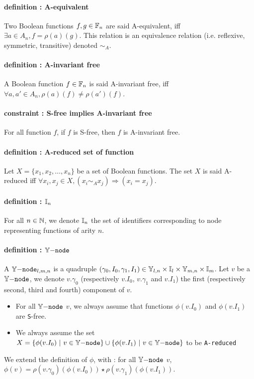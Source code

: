 \documentclass[a4paper,10pt]{article}
\begin{document}
\paragraph{definition : A-equivalent\\}
Two Boolean functions $f, g\in\mathbb{F}_n$ are said A-equivalent, iff $\exists a\in A_n, f = \rho(a)(g)$.
This relation is an equivalence relation (i.e. reflexive, symmetric, transitive) denoted $\sim_A$.

\paragraph{definition : A-invariant free\\}
A Boolean function $f\in\mathbb{F}_n$ is said A-invariant free, iff $\forall a, a'\in A_n, \rho(a)(f) \neq \rho(a')(f)$.

\paragraph{constraint : S-free implies A-invariant free\\}
For all function $f$, if $f$ is S-free, then $f$ is A-invariant free.

\paragraph{definition : A-reduced set of function\\}
Let $X = \{x_1, x_2, \dots, x_n\}$ be a set of Boolean functions.
The set $X$ is said A-reduced iff $\forall x_i, x_j \in X, (x_i \sim_A x_j) \Rightarrow (x_i = x_j)$.

\paragraph{definition : $\mathbb{I}_n$\\}
For all $n\in\mathbb{N}$, we denote $\mathbb{I}_n$ the set of identifiers corresponding to node representing functions of arity $n$.

\paragraph{definition : $\mathbb{Y}\mathtt{-node}$\\}
A $\mathbb{Y}\mathtt{-node}_{l, m, n}$ is a quadruple $(\gamma_0, I_0, \gamma_1, I_1) \in \mathbb{Y}_{l, n} \times \mathbb{I}_l \times \mathbb{Y}_{m, n} \times \mathbb{I}_m$. Let $v$ be a $\mathbb{Y}\mathtt{-node}$, we denote $v.\gamma_0$ (respectively $v.I_0$, $v.\gamma_1$ and $v.I_1$) the first (respectively second, third and fourth) component of $v$.
\begin{itemize}
\item For all $\mathbb{Y}\mathtt{-node}$ $v$, we always assume that functions $\phi(v.I_0)$ and $\phi(v.I_1)$ are \texttt{S}-free.
\item We always assume the set $X = \{\phi(v.I_0) ~|~ v \in\mathbb{Y}\mathtt{-node}\} \cup \{\phi(v.I_1) ~|~ v\in\mathbb{Y}\mathtt{-node}\}$ to be \texttt{A-reduced}
\end{itemize}
We extend the definition of $\phi$, with : for all $\mathbb{Y}\mathtt{-node}$ $v$, $\phi(v) = \rho(v.\gamma_0)(\phi(v.I_0)) \star \rho(v.\gamma_1)(\phi(v.I_1))$.
\end{document}
